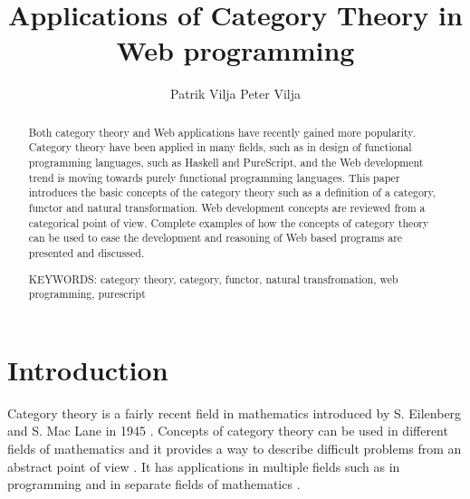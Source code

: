 \documentclass[article]{aaltoseries}
\begin{document}
 

\title{Applications of Category Theory in Web programming}

\author{Patrik Vilja Peter Vilja} %


\maketitle


\begin{abstract}
  Both category theory and Web applications have recently gained more
  popularity. Category theory have been applied in many fields, such as in
  design of functional programming languages, such as Haskell and PureScript,
  and the Web development trend is moving towards purely functional programming
  languages. This paper introduces the basic concepts of the category theory
  such as a definition of a category, functor and natural transformation. Web
  development concepts are reviewed from a categorical point of view. Complete
  examples of how the concepts of category theory can be used to ease the
  development and reasoning of Web based programs are presented and discussed.

\vspace{3mm}
\noindent KEYWORDS: category theory, category, functor, natural transfromation,
web programming, purescript 

\end{abstract}



\section{Introduction}

  Category theory is a fairly recent field in mathematics introduced by S.
  Eilenberg and S. Mac Lane in 1945 \cite{eilenberg1945general,
    awodey2006category}. Concepts of category theory can be used in different
  fields of mathematics and it provides a way to describe difficult problems
  from an abstract point of view \cite{eilenberg1945general, mclarty2007last}.
  It has applications in multiple fields such as in programming and
  in separate fields of mathematics \cite{awodey2006category, reynolds1980using,
    jones1993glasgow}. 
\end{document}
